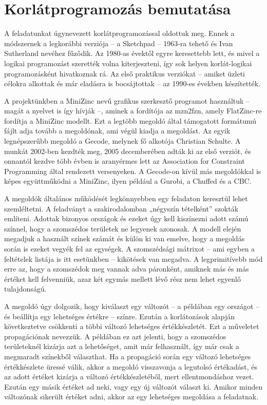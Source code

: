 \documentclass[12pt,a4paper]{report}
\begin{document}
\section{Korlátprogramozás bemutatása} 

    A feladatunkat úgynevezett korlátprogramozással oldottuk meg.
    Ennek a módszernek a legkorábbi verziója – a Sketchpad – 1963-ra tehető és Ivan Sutherland nevéhez fűződik\cite{sketchpad}.
    Az 1980-as évektől egyre keresettebb lett, és mivel a logikai programozást szerették volna kiterjeszteni, így sok helyen korlát-logikai programozásként hivatkoznak rá.
    Az első praktikus verziókat – amiket üzleti célokra alkottak és már eladásra is bocsájtottak – az 1990-es években készítették.

    A projektünkben a MiniZinc nevű grafikus szerkesztő programot használtuk – magát a nyelvet is így hívják –, aminek a fordítója az mzn2fzn, amely FlatZinc-re fordítja a MiniZinc modellt.
    Ezt a legtöbb megoldó által támogatott formátumú fájlt adja tovább a megoldónak, ami végül kiadja a megoldást.
    Az egyik legnépszerűbb megoldó a Gecode, melynek fő alkotója Christian Schulte\cite{gecode}.
    A munkát 2002-ben kezdték meg, 2005 decemberében adták ki az első verziót, és onnantól kezdve több évben is aranyérmes lett az Association for Constraint Programming által rendezett versenyeken.
    A Gecode-on kívül más megoldókkal is képes együttműködni a MiniZinc, ilyen például a Gurobi, a Chuffed és a CBC.
    
    A megoldók általános működését legkönnyebben egy feladaton keresztül lehet szemléltetni.
    A feladványt a szakirodalomban „négyszín tételként” szokták említeni.
    Adottak bizonyos országok és ezeket úgy kell kiszínezni adott számú színnel, hogy a szomszédos területek ne legyenek azonosak.
    A modell elején megadjuk a használt színek számát és külön ki van emelve, hogy a megoldás során is ezeket vegyék fel az egységek.
    A szomszédsági mátrixot – ami egyben a feltételek listája is itt esetünkben – kikötések van megadva.
    A legprimitívebb mód erre az, hogy a szomszédok meg vannak adva páronként, amiknek más és más értéket kell felvenniük, azaz két egymás mellett lévő rész nem lehet egyenlő tulajdonságú.


    A megoldó úgy dolgozik, hogy kiválaszt egy változót – a példában egy országot – és beállítja egy lehetséges értékre – színre.
    Ezután a korlátozások alapján következtetve csökkenti a többi változó lehetséges értékkészletét.
    Ezt a műveletet propagációnak nevezzük.
    A példában ez azt jelenti, hogy a szomszédos területeknél kizárja azt a lehetőséget, amit már felhasznált, így már csak a megmaradt színekből választhat.
    Ha a propagáció során egy változó lehetséges értékkészlete üressé válik, akkor a megoldó visszavonja a legutolsó értékadást, és az adott értéket kizárja a változó értékkészletéből, mert ellentmondáshoz vezet.
    Ezután egy másik értéket ad neki, vagy egy új változót választ ki.
    Amikor minden változónak sikerült értéket adni, akkor az egy lehetséges megoldása a feladatnak.
    
\end{document}
